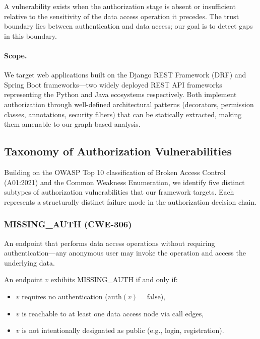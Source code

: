 A vulnerability exists when the authorization stage is absent or insufficient relative to the sensitivity of the data access operation it precedes. The trust boundary lies between authentication and data access; our goal is to detect gaps in this boundary.

\paragraph{Scope.} We target web applications built on the Django REST Framework (DRF) and Spring Boot frameworks—two widely deployed REST API frameworks representing the Python and Java ecosystems respectively. Both implement authorization through well-defined architectural patterns (decorators, permission classes, annotations, security filters) that can be statically extracted, making them amenable to our graph-based analysis.

\subsection{Taxonomy of Authorization Vulnerabilities}

Building on the OWASP Top 10 classification of Broken Access Control (A01:2021) and the Common Weakness Enumeration, we identify five distinct subtypes of authorization vulnerabilities that our framework targets. Each represents a structurally distinct failure mode in the authorization decision chain.

\subsubsection{MISSING\_AUTH (CWE-306)}

An endpoint that performs data access operations without requiring authentication—any anonymous user may invoke the operation and access the underlying data.

\begin{definition}
An endpoint $v$ exhibits MISSING\_AUTH if and only if:
\begin{itemize}
    \item $v$ requires no authentication ($\text{auth}(v) = \text{false}$),
    \item $v$ is reachable to at least one data access node via call edges,
    \item $v$ is not intentionally designated as public (e.g., login, registration).
\end{itemize}
\end{definition}

